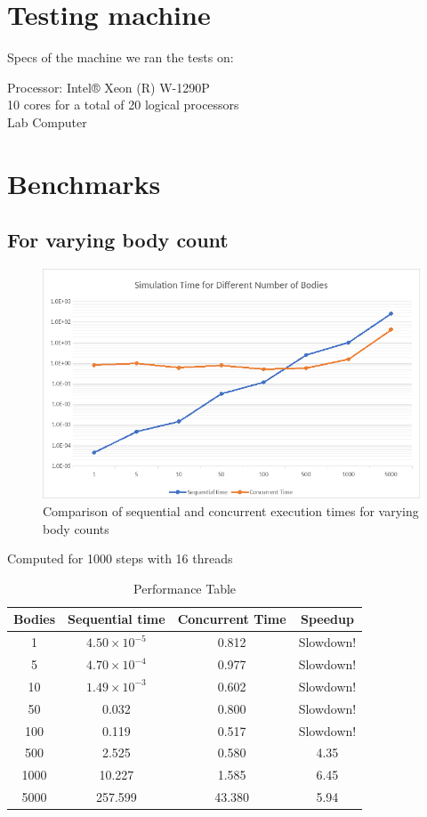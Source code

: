 \documentclass{article}
\begin{document}
\section{Testing machine}
Specs of the machine we ran the tests on:

Processor: Intel® Xeon (R) W-1290P\\
10 cores for a total of 20 logical processors\\
Lab Computer

\section{Benchmarks}
\subsection{For varying body count}

\begin{figure}
        \centering
        \includegraphics[width=1\linewidth]{graph.png}
        \caption{Comparison of sequential and concurrent execution times for varying body counts}
        \label{fig:enter-label}
\end{figure}
Computed for 1000 steps with 16 threads



\begin{table}[h]  
  \centering
  \begin{tabular}{|c|c|c|c|}
    \hline
    Bodies & Sequential time & Concurrent Time & Speedup \\ \hline
    1 & $4.50\times 10^{-5}$ & 0.812 & Slowdown! \\ \hline
    5 & $4.70\times 10^{-4}$ & 0.977 & Slowdown! \\ \hline
    10 & $1.49\times 10^{-3}$ & 0.602 & Slowdown! \\ \hline
    50 & 0.032 & 0.800 & Slowdown! \\ \hline
    100 & 0.119 & 0.517 & Slowdown! \\ \hline
    500 & 2.525 & 0.580 & 4.35 \\ \hline
    1000 & 10.227 & 1.585 & 6.45 \\ \hline
    5000 & 257.599 & 43.380 & 5.94 \\ \hline
  \end{tabular}
  \caption{Performance Table}
  \label{tab:performance_table}
\end{table}
\end{document}
